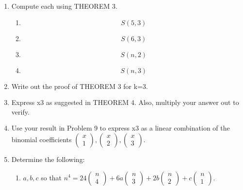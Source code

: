 \documentclass{article}
\begin{document}
\begin{enumerate}
\item Compute each using THEOREM 3. 

\begin{enumerate}
\item \begin{equation*}
S\left(5,3\right)
\end{equation*}
\item \begin{equation*}
S(6,3)
\end{equation*}
\item \begin{equation*}
S(n,2)
\end{equation*}
\item \begin{equation*}
S(n,3)
\end{equation*}
\end{enumerate}
\item Write out the proof of THEOREM 3 for k=3.
\item Express x3 as suggested in THEOREM 4. Also, multiply your answer out to verify. 
\item Use your result in Problem 9 to express x3 as a linear combination of the binomial coefficients 
$\left(\begin{matrix}x\\1\end{matrix}\right),\left(\begin{matrix}x\\2\end{matrix}\right),\left(\begin{matrix}x\\3\end{matrix}\right)$.

\item Determine the following:

\begin{enumerate}
\item  $a,b,c$ so that 
$n^4=24\left(\begin{matrix}n\\4\end{matrix}\right)+6a\left(\begin{matrix}n\\3\end{matrix}\right)+2b\left(\begin{matrix}n\\2\end{matrix}\right)+c\left(\begin{matrix}n\\1\end{matrix}\right)$.
\end{enumerate}
\end{enumerate}
\end{document}
